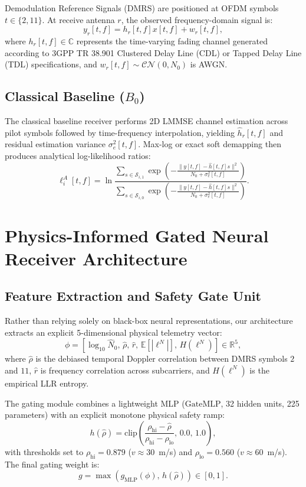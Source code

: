 \documentclass[journal,10pt,twocolumn]{IEEEtran}
\theoremstyle{definition}
\begin{document}
Demodulation Reference Signals (DMRS) are positioned at OFDM symbols $t \in \{2, 11\}$. At receive antenna $r$, the observed frequency-domain signal is:
\begin{equation}
    y_r[t, f] = h_r[t, f] x[t, f] + w_r[t, f],
\end{equation}
where $h_r[t, f] \in \mathbb{C}$ represents the time-varying fading channel generated according to 3GPP TR 38.901 Clustered Delay Line (CDL) or Tapped Delay Line (TDL) specifications, and $w_r[t, f] \sim \mathcal{CN}(0, N_0)$ is AWGN.

\subsection{Classical Baseline ($B_0$)}
The classical baseline receiver performs 2D LMMSE channel estimation across pilot symbols followed by time-frequency interpolation, yielding $\hat{h}_r[t, f]$ and residual estimation variance $\sigma_e^2[t, f]$. Max-log or exact soft demapping then produces analytical log-likelihood ratios:
\begin{equation}
    \ell_i^A[t, f] = \ln \frac{\sum_{s \in \mathcal{S}_{i,1}} \exp\left( - \frac{\|y[t, f] - \hat{h}[t, f] s\|^2}{N_0 + \sigma_e^2[t, f]} \right)}{\sum_{s \in \mathcal{S}_{i,0}} \exp\left( - \frac{\|y[t, f] - \hat{h}[t, f] s\|^2}{N_0 + \sigma_e^2[t, f]} \right)}.
\end{equation}

\section{Physics-Informed Gated Neural Receiver Architecture}
\subsection{Feature Extraction and Safety Gate Unit}
Rather than relying solely on black-box neural representations, our architecture extracts an explicit 5-dimensional physical telemetry vector:
\begin{equation}
    \phi = \left[ \log_{10}\hat{N}_0, \, \hat{\rho}, \, \hat{r}, \, \mathbb{E}[|\ell^N|], \, H(\ell^N) \right] \in \mathbb{R}^5,
\end{equation}
where $\hat{\rho}$ is the debiased temporal Doppler correlation between DMRS symbols $2$ and $11$, $\hat{r}$ is frequency correlation across subcarriers, and $H(\ell^N)$ is the empirical LLR entropy.

The gating module combines a lightweight MLP ($\mathrm{GateMLP}$, 32 hidden units, 225 parameters) with an explicit monotone physical safety ramp:
\begin{equation}
    h(\hat{\rho}) = \mathrm{clip}\left( \frac{\rho_{\mathrm{hi}} - \hat{\rho}}{\rho_{\mathrm{hi}} - \rho_{\mathrm{lo}}}, \, 0.0, \, 1.0 \right),
\end{equation}
with thresholds set to $\rho_{\mathrm{hi}} = 0.879$ ($v \approx 30$~m/s) and $\rho_{\mathrm{lo}} = 0.560$ ($v \approx 60$~m/s). The final gating weight is:
\begin{equation}
    g = \max\left( g_{\mathrm{MLP}}(\phi), \, h(\hat{\rho}) \right) \in [0, 1].
\end{equation}
\end{document}
